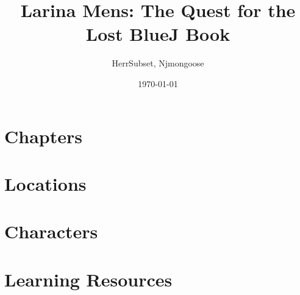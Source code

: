 \documentclass[11pt,a4paper]{article}
\title{Larina Mens: The Quest for the Lost BlueJ Book}
\date{\today}
\author{HerrSubset, Njmongoose}
\begin{document}
\maketitle
\newpage
\tableofcontents
\newpage

\part{Chapters}




\newpage
\part{Locations}


\newpage
\part{Characters}



\newpage
\part{Learning Resources}

\end{document}
